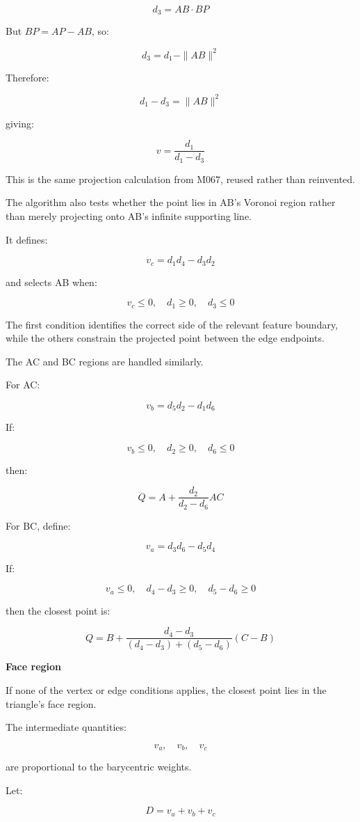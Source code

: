 \[
d_3=AB\cdot BP
\]

But \(BP=AP-AB\), so:

\[
d_3=d_1-\|AB\|^2
\]

Therefore:

\[
d_1-d_3=\|AB\|^2
\]

giving:

\[
\boxed{v=\frac{d_1}{d_1-d_3}}
\]

This is the same projection calculation from M067, reused rather than reinvented.

The algorithm also tests whether the point lies in AB's Voronoi region rather than merely projecting onto AB's infinite supporting line.

It defines:

\[
v_c=d_1d_4-d_3d_2
\]

and selects AB when:

\[
v_c\le0,\quad d_1\ge0,\quad d_3\le0
\]

The first condition identifies the correct side of the relevant feature boundary, while the others constrain the projected point between the edge endpoints.

The AC and BC regions are handled similarly.

For AC:

\[
v_b=d_5d_2-d_1d_6
\]

If:

\[
v_b\le0,\quad d_2\ge0,\quad d_6\le0
\]

then:

\[
\boxed{ Q=A+\frac{d_2}{d_2-d_6}AC }
\]

For BC, define:

\[
v_a=d_3d_6-d_5d_4
\]

If:

\[
v_a\le0,\quad d_4-d_3\ge0,\quad d_5-d_6\ge0
\]

then the closest point is:

\[
\boxed{ Q=B+ \frac{d_4-d_3} {(d_4-d_3)+(d_5-d_6)} (C-B) }
\]

\textbf{Face region}

If none of the vertex or edge conditions applies, the closest point lies in the triangle's face region.

The intermediate quantities:

\[
v_a,\quad v_b,\quad v_c
\]

are proportional to the barycentric weights.

Let:

\[
D=v_a+v_b+v_c
\]

